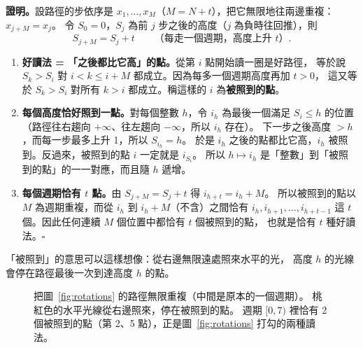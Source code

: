 \documentclass[11pt,a4paper]{article}
\newcounter{lph}
\newcommand{\LStep}[3]{%
  \edef\lpyA{\arabic{lph}}%
  \if#3u\addtocounter{lph}{1}\def\lpcol{gray!75!black}\fi
  \if#3c\addtocounter{lph}{-1}\def\lpcol{cA}\fi
  \if#3T\addtocounter{lph}{-2}\def\lpcol{cB}\fi
  \edef\lpyB{\arabic{lph}}%
  \draw[color=\lpcol,line width=1.3pt,line cap=round] ({#1+#2},\lpyA) -- ({#1+#2+1},\lpyB);
  \fill ({#1+#2},\lpyA) circle (1.3pt);
  \fill ({#1+#2+1},\lpyB) circle (1.3pt);
}
\newcommand{\LPath}[3]{%
  \setcounter{lph}{#2}%
  \foreach \lps [count=\lpj from 0] in {#3}{\LStep{#1}{\lpj}{\lps}}%
}
\begin{document}
\textbf{證明。}設路徑的步依序是 $x_1,\ldots,x_M$（$M=N+t$），把它無限地往兩邊重複：$x_{j+M}=x_j$。
令 $S_0=0$，$S_j$ 為前 $j$ 步之後的高度（$j$ 為負時往回推），則
\[
S_{j+M}=S_j+t\qquad\text{（每走一個週期，高度上升 $t$）}.
\]
\begin{enumerate}[leftmargin=1.6em]
  \item \textbf{好讀法 = 「之後都比它高」的點。}從第 $i$ 點開始讀一圈是好路徑，
        等於說 $S_k>S_i$ 對 $i<k\le i+M$ 都成立。因為每多一個週期高度再加 $t>0$，
        這又等於 $S_k>S_i$ 對所有 $k>i$ 都成立。稱這樣的 $i$ 為\textbf{被照到的點}。
  \item \textbf{每個高度恰好照到一點。}對每個整數 $h$，令 $i_h$ 為最後一個滿足 $S_i\le h$ 的位置
        （路徑往右趨向 $+\infty$、往左趨向 $-\infty$，所以 $i_h$ 存在）。
        下一步之後高度 $>h$，而每一步最多上升 1，所以 $S_{i_h}=h$。
        於是 $i_h$ 之後的點都比它高，$i_h$ 被照到。反過來，被照到的點 $i$ 一定就是 $i_{S_i}$。
        所以 $h\mapsto i_h$ 是「整數」到「被照到的點」的一一對應，而且隨 $h$ 遞增。
  \item \textbf{每個週期恰有 $t$ 點。}由 $S_{j+M}=S_j+t$ 得 $i_{h+t}=i_h+M$。
        所以被照到的點以 $M$ 為週期重複，而從 $i_h$ 到 $i_h+M$（不含）之間恰有
        $i_h,i_{h+1},\ldots,i_{h+t-1}$ 這 $t$ 個。因此任何連續 $M$ 個位置中都恰有 $t$ 個被照到的點，
        也就是恰有 $t$ 種好讀法。\hfill$\square$
\end{enumerate}

「被照到」的意思可以這樣想像：從右邊無限遠處照來水平的光，
高度 $h$ 的光線會停在路徑最後一次到達高度 $h$ 的點。

\begin{figure}[H]
\centering
{}
\caption{把圖~\ref{fig:rotations} 的路徑無限重複（中間是原本的一個週期）。
\textcolor{magenta!80!black}{桃紅色}的水平光線從右邊照來，停在被照到的點。
週期 $[0,7)$ 裡恰有 2 個被照到的點（第 2、5 點），正是圖~\ref{fig:rotations} 打勾的兩種讀法。}
\label{fig:light}
\end{figure}
\end{document}
